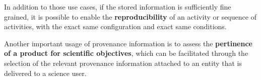 
In addition to those use cases, if the stored information is sufficiently fine grained, it is possible to enable the \textbf{reproducibility} of an activity or sequence of activities, with the exact same configuration and exact same conditions.

Another important usage of provenance information is to assess the \textbf{pertinence of a product for scientific objectives}, which can be facilitated through the selection of the relevant provenance information attached to an entity that is delivered to a science user.
